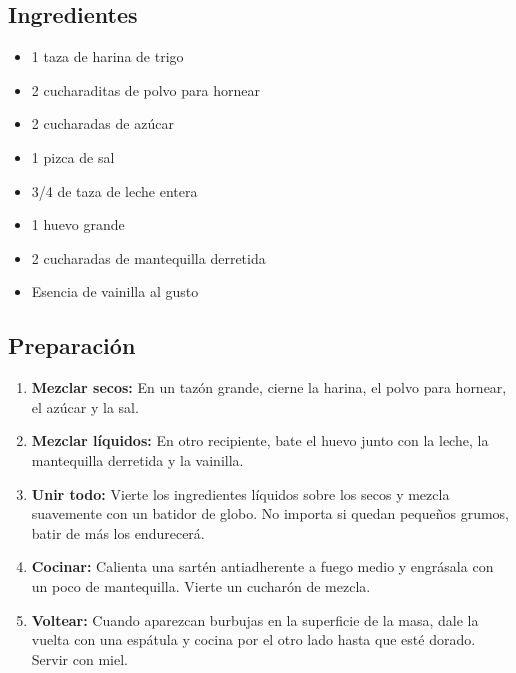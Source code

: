 \documentclass[11pt,a4paper]{article}
\begin{document}
\begin{minipage}[t]{0.45\linewidth}
    \subsection*{Ingredientes}
    \begin{itemize}[leftmargin=*]
        \item 1 taza de harina de trigo
        \item 2 cucharaditas de polvo para hornear
        \item 2 cucharadas de azúcar
        \item 1 pizca de sal
        \item 3/4 de taza de leche entera
        \item 1 huevo grande
        \item 2 cucharadas de mantequilla derretida
        \item Esencia de vainilla al gusto
    \end{itemize}
\end{minipage}
\hfill
\begin{minipage}[t]{0.5\linewidth}
    \subsection*{Preparación}
    \begin{enumerate}[leftmargin=*]
        \item \textbf{Mezclar secos:} En un tazón grande, cierne la harina, el polvo para hornear, el azúcar y la sal.
        \item \textbf{Mezclar líquidos:} En otro recipiente, bate el huevo junto con la leche, la mantequilla derretida y la vainilla.
        \item \textbf{Unir todo:} Vierte los ingredientes líquidos sobre los secos y mezcla suavemente con un batidor de globo. No importa si quedan pequeños grumos, batir de más los endurecerá.
        \item \textbf{Cocinar:} Calienta una sartén antiadherente a fuego medio y engrásala con un poco de mantequilla. Vierte un cucharón de mezcla.
        \item \textbf{Voltear:} Cuando aparezcan burbujas en la superficie de la masa, dale la vuelta con una espátula y cocina por el otro lado hasta que esté dorado. Servir con miel.
    \end{enumerate}
\end{minipage}
\end{document}
